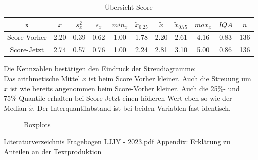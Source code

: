 \documentclass[11pt, a4paper]{article}
\begin{document}
\begin{table}[htb]
	\vspace{-1.5cm}
	\centering
	\begin{tabular}{c|ccccccccc|c}
		x & $\bar{x}$ & $s_x^2$ & $s_x$ & $min_x$ & $\tilde{x}_{0.25}$ & $\tilde{x}$ & $\tilde{x}_{0.75}$ & $max_x$ & $IQA$ & $n$ \\ \hline
		Score-Vorher & 2.20 & 0.39 & 0.62 & 1.00 & 1.78 & 2.20 & 2.61 & 4.16 & 0.83 & 136 \\
		Score-Jetzt & 2.74 & 0.57 & 0.76 & 1.00 & 2.24 & 2.81 & 3.10 & 5.00 & 0.86 & 136
	\end{tabular}
	\caption{Übersicht Score}
\end{table}
	Die Kennzahlen bestätigen den Eindruck der Streudiagramme:\\
Das arithmetische Mittel $\bar{x}$ ist beim Score Vorher kleiner.
Auch die Streuung um $\bar{x}$ ist wie bereits angenommen beim Score-Vorher kleiner. Auch die 25\%- und 75\%-Quantile erhalten bei Score-Jetzt einen höheren Wert eben so wie der Median $\tilde{x}$.
Der Interquantilabstand ist bei beiden Variablen fast identisch.


\leavevmode


\begin{figure}
	\vspace{-1.5cm}
	\centering 
	\vspace{-1cm}
	\caption{Boxplots}
\end{figure}


\newpage
 Literaturverzeichnis
\newpage 
 {Fragebogen LJJY - 2023.pdf}
\newpage Appendix: Erklärung zu Anteilen an der Textproduktion
\end{document}
